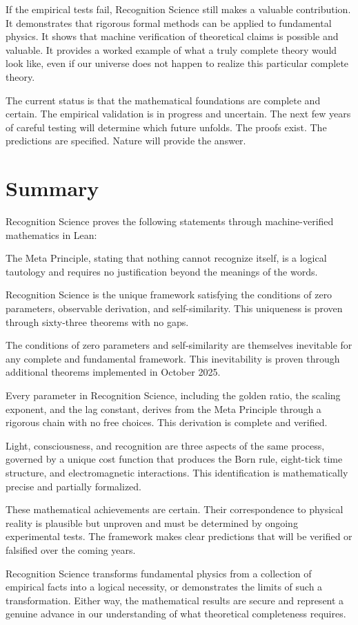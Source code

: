 \documentclass[12pt]{article}
\begin{document}
If the empirical tests fail, Recognition Science still makes a valuable contribution. It demonstrates that rigorous formal methods can be applied to fundamental physics. It shows that machine verification of theoretical claims is possible and valuable. It provides a worked example of what a truly complete theory would look like, even if our universe does not happen to realize this particular complete theory.

The current status is that the mathematical foundations are complete and certain. The empirical validation is in progress and uncertain. The next few years of careful testing will determine which future unfolds. The proofs exist. The predictions are specified. Nature will provide the answer.

\section{Summary}

Recognition Science proves the following statements through machine-verified mathematics in Lean:

The Meta Principle, stating that nothing cannot recognize itself, is a logical tautology and requires no justification beyond the meanings of the words.

Recognition Science is the unique framework satisfying the conditions of zero parameters, observable derivation, and self-similarity. This uniqueness is proven through sixty-three theorems with no gaps.

The conditions of zero parameters and self-similarity are themselves inevitable for any complete and fundamental framework. This inevitability is proven through additional theorems implemented in October 2025.

Every parameter in Recognition Science, including the golden ratio, the scaling exponent, and the lag constant, derives from the Meta Principle through a rigorous chain with no free choices. This derivation is complete and verified.

Light, consciousness, and recognition are three aspects of the same process, governed by a unique cost function that produces the Born rule, eight-tick time structure, and electromagnetic interactions. This identification is mathematically precise and partially formalized.

These mathematical achievements are certain. Their correspondence to physical reality is plausible but unproven and must be determined by ongoing experimental tests. The framework makes clear predictions that will be verified or falsified over the coming years.

Recognition Science transforms fundamental physics from a collection of empirical facts into a logical necessity, or demonstrates the limits of such a transformation. Either way, the mathematical results are secure and represent a genuine advance in our understanding of what theoretical completeness requires.
\end{document}
